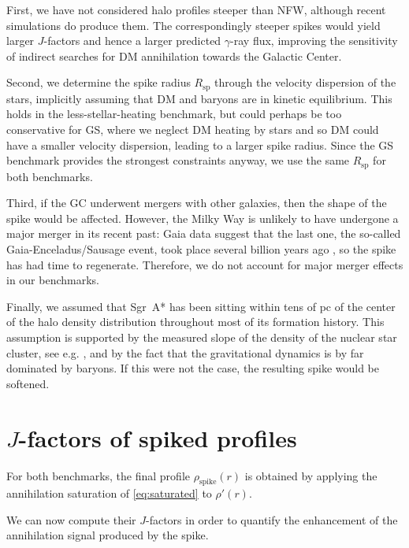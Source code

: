 First, we have not considered halo profiles steeper than NFW, although recent simulations do produce them. 
The correspondingly steeper spikes would yield larger $J$-factors and hence a larger predicted $\gamma$-ray flux, improving the sensitivity of indirect searches for DM annihilation towards the Galactic Center.

Second, we determine the spike radius $R_{\mathrm{sp}}$ through the velocity dispersion of the stars, implicitly assuming that DM and baryons are in kinetic equilibrium.
This holds in the less-stellar-heating benchmark, but could perhaps be too conservative
for GS, where we neglect DM heating by stars and so DM could have a smaller velocity
dispersion, leading to a larger spike radius. Since the GS benchmark provides the strongest constraints anyway,
we use the same $R_{\mathrm{sp}}$
for both benchmarks.

Third, if the GC underwent mergers with other galaxies, then the shape of the spike would
be affected. However, the Milky Way is unlikely to have undergone a major merger in its
recent past: Gaia data suggest that the last one, the so-called Gaia-Enceladus/Sausage event, took place several billion
years ago \cite{Belokurov2018,Helmi2018,Ciuca2024}, so the spike has had time to regenerate. Therefore, we do not account for major merger
effects in our benchmarks.

Finally, we assumed that Sgr~A* has been sitting within tens of pc of the center of the halo density distribution
throughout most
of its formation history.
This assumption is supported by the measured slope
of the density of the nuclear star cluster, see e.g. \cite{GallegoCano2020}, and by the fact that the gravitational dynamics is by far dominated by baryons.
If this were not the case, the resulting spike would be softened.





\section{$J$-factors of spiked profiles}

For both benchmarks, the final profile $\rho_{\mathrm{spike}}(r)$ is obtained by applying the
annihilation saturation of \cref{eq:saturated} to $\rho'(r)$. 

We can now compute their $J$-factors in order to quantify the enhancement
of the annihilation signal produced by the spike.

